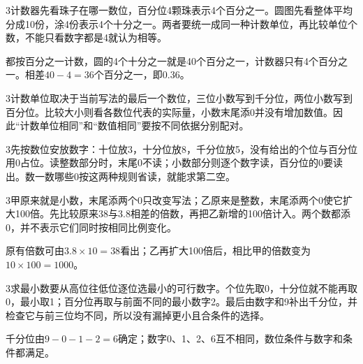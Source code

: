 \documentclass[multi=snippet,border={5bp 20bp 5bp 5bp}]{standalone}
\newenvironment{snippet}[3]{\begin{minipage}{#1bp}\color{answerred}\fontsize{#2}{#3}\selectfont\raggedright}{\end{minipage}}
\begin{document}
\begin{snippet}{505}{11.5}{14}\begin{multicols}{3}\raggedcolumns 计数器先看珠子在哪一数位，百分位4颗珠表示4个百分之一。圆图先看整体平均分成10份，涂4份表示4个十分之一。两者要统一成同一种计数单位，再比较单位个数，不能只看数字都是4就认为相等。\par 都按百分之一计数，圆的4个十分之一就是40个百分之一，计数器只有4个百分之一。相差\(40-4=36\)\allowbreak 个百分之一，即0.36。\end{multicols}\end{snippet}
\begin{snippet}{505}{11.5}{14}\begin{multicols}{3}\raggedcolumns 计数单位取决于当前写法的最后一个数位，三位小数写到千分位，两位小数写到百分位。比较大小则看各数位代表的实际量，小数末尾添0并没有增加数值。因此“计数单位相同”和“数值相同”要按不同依据分别配对。\end{multicols}\end{snippet}
\begin{snippet}{505}{11.5}{14}\begin{multicols}{3}\raggedcolumns 先按数位安放数字：十位放3，十分位放8，千分位放5，没有给出的个位与百分位用0占位。读整数部分时，末尾0不读；小数部分则逐个数字读，百分位的0要读出。数一数哪些0按这两种规则省读，就能求第二空。\end{multicols}\end{snippet}
\begin{snippet}{505}{11.5}{14}\begin{multicols}{3}\raggedcolumns 甲原来就是小数，末尾添两个0只改变写法；乙原来是整数，末尾添两个0使它扩大100倍。先比较原来38与3.8相差的倍数，再把乙新增的100倍计入。两个数都添0，并不表示它们同时按相同比例变化。\par 原有倍数可由\(3.8\times10=38\)\allowbreak 看出；乙再扩大100倍后，相比甲的倍数变为\(10\times100=1000\)\allowbreak 。\end{multicols}\end{snippet}
\begin{snippet}{505}{11.5}{14}\begin{multicols}{3}\raggedcolumns 求最小数要从高位往低位逐位选最小的可行数字。个位先取0，十分位就不能再取0，最小取1；百分位再取与前面不同的最小数字2。最后由数字和9补出千分位，并检查它与前三位均不同，所以没有漏掉更小且合条件的选择。\par 千分位由\(9-0-1-2=6\)\allowbreak 确定；数字0、1、2、6互不相同，数位条件与数字和条件都满足。\end{multicols}\end{snippet}
\end{document}
